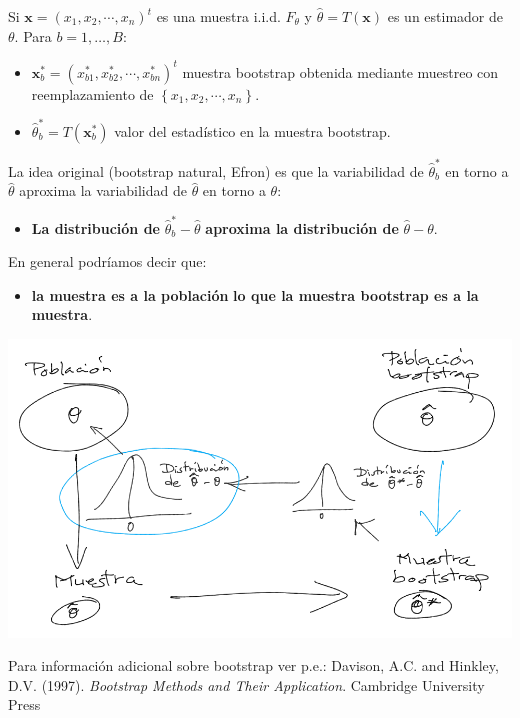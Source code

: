 \documentclass[]{book}
\providecommand{\tightlist}{%
  \setlength{\itemsep}{0pt}\setlength{\parskip}{0pt}}
\theoremstyle{definition}
\theoremstyle{definition}
\theoremstyle{definition}
\theoremstyle{remark}
\begin{document}
Si \(\mathbf{x} = \left( x_{1},x_{2},\cdots ,x_{n}\right) ^{t}\) es una
muestra i.i.d. \(F_{\theta }\) y
\(\hat{\theta} = T\left( \mathbf{x} \right)\) es un estimador de
\(\theta\). Para \(b = 1,\ldots ,B:\)

\begin{itemize}
\item
  \(\mathbf{x}_{b}^{\ast } = \left( x_{b1}^{\ast },x_{b2}^{\ast },\cdots ,x_{bn}^{\ast }\right) ^{t}\)
  muestra bootstrap obtenida mediante muestreo con reemplazamiento de
  \(\left\{ x_{1},x_{2},\cdots ,x_{n}\right\}\).
\item
  \(\hat{\theta}_{b}^{\ast } = T\left( \mathbf{x}_{b}^{\ast }\right)\)
  valor del estadístico en la muestra bootstrap.
\end{itemize}

La idea original (bootstrap natural, Efron) es que la variabilidad de
\(\hat{\theta}_{b}^{\ast }\) en torno a \(\hat{\theta}\) aproxima la
variabilidad de \(\hat{\theta}\) en torno a \(\theta\):

\begin{itemize}
\tightlist
\item
  \textbf{La distribución de} \(\hat{\theta}_{b}^{\ast }-\hat{\theta}\)
  \textbf{aproxima la distribución de} \(\hat{\theta}-\theta\).
\end{itemize}

En general podríamos decir que:

\begin{itemize}
\tightlist
\item
  \textbf{la muestra es a la población} \textbf{lo que la muestra
  bootstrap es a la muestra}.
\end{itemize}

\begin{center}\includegraphics[width=0.7\linewidth]{images/bootstrap} \end{center}

Para información adicional sobre bootstrap ver p.e.: Davison, A.C. and
Hinkley, D.V. (1997). \emph{Bootstrap Methods and Their Application}.
Cambridge University Press
\end{document}
